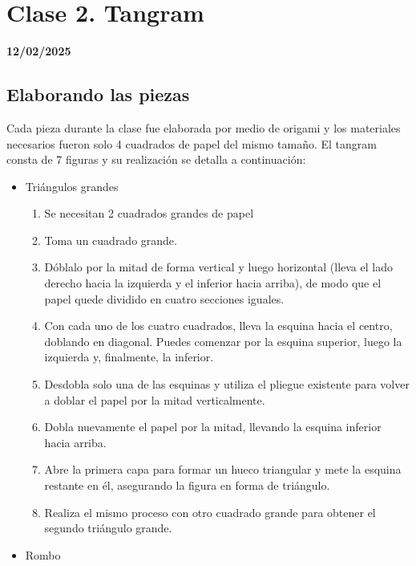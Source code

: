 \chapter{Clase 2. Tangram}
\textbf{12/02/2025}
\section{Elaborando las piezas}

Cada pieza durante la clase fue elaborada por medio de origami y los materiales necesarios fueron solo 4 cuadrados de papel del mismo tamaño. El tangram consta de 7 figuras y su realización se detalla a continuación:

\begin{itemize}
    
    \item Triángulos grandes
    \begin{enumerate}

        \item  Se necesitan 2 cuadrados grandes de papel
        \item Toma un cuadrado grande.  
        \item Dóblalo por la mitad de forma vertical y luego horizontal (lleva el lado derecho hacia la izquierda y el inferior hacia arriba), de modo que el papel quede dividido en cuatro secciones iguales.  
        \item Con cada uno de los cuatro cuadrados, lleva la esquina hacia el centro, doblando en diagonal. Puedes comenzar por la esquina superior, luego la izquierda y, finalmente, la inferior.  
        \item Desdobla solo una de las esquinas y utiliza el pliegue existente para volver a doblar el papel por la mitad verticalmente.  
        \item Dobla nuevamente el papel por la mitad, llevando la esquina inferior hacia arriba.  
        \item Abre la primera capa para formar un hueco triangular y mete la esquina restante en él, asegurando la figura en forma de triángulo.  
        \item Realiza el mismo proceso con otro cuadrado grande para obtener el segundo triángulo grande.
        
    \end{enumerate}

    \item Rombo
    \begin{enumerate}


\end{enumerate}
\end{itemize}
